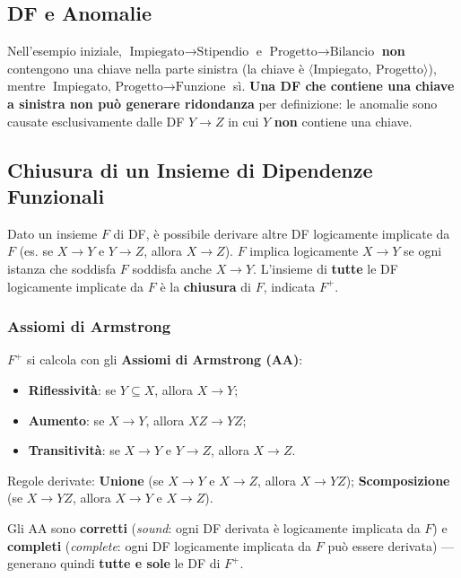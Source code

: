 \documentclass[12pt, a4paper]{article}
\begin{document}
\subsection{DF e Anomalie}

Nell'esempio iniziale, $\text{Impiegato} \rightarrow \text{Stipendio}$ e $\text{Progetto} \rightarrow \text{Bilancio}$ \textbf{non} contengono una chiave nella parte sinistra (la chiave è $\langle$Impiegato, Progetto$\rangle$), mentre $\text{Impiegato, Progetto} \rightarrow \text{Funzione}$ sì. \textbf{Una DF che contiene una chiave a sinistra non può generare ridondanza} per definizione: le anomalie sono causate esclusivamente dalle DF $Y \rightarrow Z$ in cui $Y$ \textbf{non} contiene una chiave.

\subsection{Chiusura di un Insieme di Dipendenze Funzionali}

Dato un insieme $F$ di DF, è possibile derivare altre DF logicamente implicate da $F$ (es. se $X \rightarrow Y$ e $Y \rightarrow Z$, allora $X \rightarrow Z$). $F$ implica logicamente $X \rightarrow Y$ se ogni istanza che soddisfa $F$ soddisfa anche $X \rightarrow Y$. L'insieme di \textbf{tutte} le DF logicamente implicate da $F$ è la \textbf{chiusura} di $F$, indicata $F^+$.

\subsubsection{Assiomi di Armstrong}

$F^+$ si calcola con gli \textbf{Assiomi di Armstrong (AA)}:
\begin{itemize}
    \item \textbf{Riflessività}: se $Y \subseteq X$, allora $X \rightarrow Y$;
    \item \textbf{Aumento}: se $X \rightarrow Y$, allora $XZ \rightarrow YZ$;
    \item \textbf{Transitività}: se $X \rightarrow Y$ e $Y \rightarrow Z$, allora $X \rightarrow Z$.
\end{itemize}
Regole derivate: \textbf{Unione} (se $X\rightarrow Y$ e $X\rightarrow Z$, allora $X\rightarrow YZ$); \textbf{Scomposizione} (se $X \rightarrow YZ$, allora $X\rightarrow Y$ e $X \rightarrow Z$).

Gli AA sono \textbf{corretti} (\textit{sound}: ogni DF derivata è logicamente implicata da $F$) e \textbf{completi} (\textit{complete}: ogni DF logicamente implicata da $F$ può essere derivata) — generano quindi \textbf{tutte e sole} le DF di $F^+$.
\end{document}
